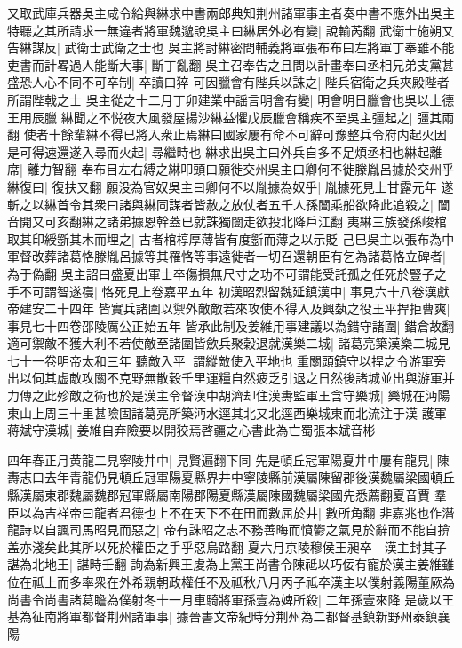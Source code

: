 又取武庫兵器吳主咸令給與綝求中書兩郎典知荆州諸軍事主者奏中書不應外出吳主特聽之其所請求一無違者將軍魏邈說吳主曰綝居外必有變|{
	說輸芮翻}
武衛士施朔又告綝謀反|{
	武衛士武衛之士也}
吳主將討綝密問輔義將軍張布布曰左將軍丁奉雖不能吏書而計畧過人能斷大事|{
	斷丁亂翻}
吳主召奉告之且問以計畫奉曰丞相兄弟支黨甚盛恐人心不同不可卒制|{
	卒讀曰猝}
可因臘會有陛兵以誅之|{
	陛兵宿衛之兵夾殿陛者所謂陛戟之士}
吳主從之十二月丁卯建業中謡言明會有變|{
	明會明日臘會也吳以土德王用辰臘}
綝聞之不悦夜大風發屋揚沙綝益懼戊辰臘會稱疾不至吳主彊起之|{
	彊其兩翻}
使者十餘輩綝不得已將入衆止焉綝曰國家屢有命不可辭可豫整兵令府内起火因是可得速還遂入尋而火起|{
	尋繼時也}
綝求出吳主曰外兵自多不足煩丞相也綝起離席|{
	離力智翻}
奉布目左右縛之綝叩頭曰願徙交州吳主曰卿何不徙滕胤呂據於交州乎綝復曰|{
	復扶又翻}
願没為官奴吳主曰卿何不以胤據為奴乎|{
	胤據死見上甘露元年}
遂斬之以綝首令其衆曰諸與綝同謀者皆赦之放仗者五千人孫闓乘船欲降此追殺之|{
	闓音開又可亥翻綝之諸弟據恩幹蓋已就誅獨闓走欲投北降戶江翻}
夷綝三族發孫峻棺取其印綬斵其木而埋之|{
	古者棺椁厚薄皆有度斵而薄之以示貶}
己巳吳主以張布為中軍督改葬諸葛恪滕胤呂據等其罹恪等事遠徙者一切召還朝臣有乞為諸葛恪立碑者|{
	為于偽翻}
吳主詔曰盛夏出軍士卒傷損無尺寸之功不可謂能受託孤之任死於豎子之手不可謂智遂寑|{
	恪死見上卷嘉平五年}
初漢昭烈留魏延鎮漢中|{
	事見六十八卷漢獻帝建安二十四年}
皆實兵諸圍以禦外敵敵若來攻使不得入及興埶之役王平捍拒曹爽|{
	事見七十四卷邵陵厲公正始五年}
皆承此制及姜維用事建議以為錯守諸圍|{
	錯倉故翻}
適可禦敵不獲大利不若使敵至諸圍皆歛兵聚穀退就漢樂二城|{
	諸葛亮築漢樂二城見七十一卷明帝太和三年}
聽敵入平|{
	謂縱敵使入平地也}
重關頭鎮守以捍之令游軍旁出以伺其虚敵攻關不克野無散穀千里運糧自然疲乏引退之日然後諸城並出與游軍并力傳之此殄敵之術也於是漢主令督漢中胡濟却住漢夀監軍王含守樂城|{
	樂城在沔陽東山上周三十里甚險固諸葛亮所築沔水逕其北又北逕西樂城東而北流注于漢}
護軍蒋斌守漢城|{
	姜維自弃險要以開狡焉啓疆之心書此為亡蜀張本斌音彬}


四年春正月黄龍二見寧陵井中|{
	見賢遍翻下同}
先是頓丘冠軍陽夏井中屢有龍見|{
	陳夀志曰去年青龍仍見頓丘冠軍陽夏縣界井中寧陵縣前漢屬陳留郡後漢魏屬梁國頓丘縣漢屬東郡魏屬魏郡冠軍縣屬南陽郡陽夏縣漢屬陳國魏屬梁國先悉薦翻夏音賈}
羣臣以為吉祥帝曰龍者君德也上不在天下不在田而數屈於井|{
	數所角翻}
非嘉兆也作潛龍詩以自諷司馬昭見而惡之|{
	帝有誅昭之志不務善晦而憤鬰之氣見於辭而不能自揜盖亦淺矣此其所以死於權臣之手乎惡烏路翻}
夏六月京陵穆侯王昶卒　漢主封其子諶為北地王|{
	諶時壬翻}
詢為新興王䖍為上黨王尚書令陳祗以巧佞有寵於漢主姜維雖位在祗上而多率衆在外希親朝政權任不及祗秋八月丙子祗卒漢主以僕射義陽董厥為尚書令尚書諸葛瞻為僕射冬十一月車騎將軍孫壹為婢所殺|{
	二年孫壹來降}
是歲以王基為征南將軍都督荆州諸軍事|{
	據晉書文帝紀時分荆州為二都督基鎮新野州泰鎮襄陽}



